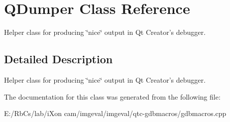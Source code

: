 \hypertarget{class_q_dumper}{
\section{QDumper Class Reference}
\label{class_q_dumper}
}
Helper class for producing \char`\"{}nice\char`\"{} output in Qt Creator's debugger.  




\subsection{Detailed Description}
Helper class for producing \char`\"{}nice\char`\"{} output in Qt Creator's debugger. 

The documentation for this class was generated from the following file:\begin{CompactItemize}
\item 
E:/RbCs/lab/iXon cam/imgeval/imgeval/qtc-gdbmacros/gdbmacros.cpp\end{CompactItemize}
